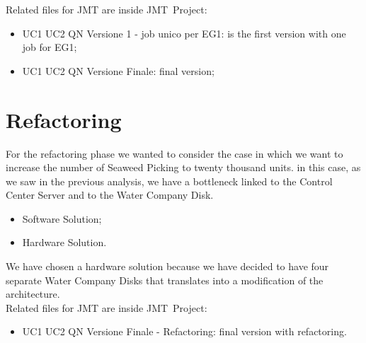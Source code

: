 Related files for JMT are inside JMT\ Project:
\begin{itemize}
	\item UC1 UC2 QN Versione 1 - job unico per EG1: is the first version with one job for EG1;
	\item UC1 UC2 QN Versione Finale: final version;
\end{itemize}

\section{Refactoring}

For the refactoring phase we wanted to consider the case in which we want to increase the number of Seaweed Picking to twenty thousand units. in this case, as we saw in the previous analysis, we have a bottleneck linked to the Control Center Server and to the Water Company Disk.

\begin{itemize}
	\item Software Solution;
	\item Hardware Solution.
\end{itemize}

We have chosen a hardware solution because we have decided to have four separate Water Company Disks that translates into a modification of the architecture.\\

Related files for JMT are inside JMT\ Project:
\begin{itemize}
	\item UC1 UC2 QN Versione Finale - Refactoring: final version with refactoring.
\end{itemize}